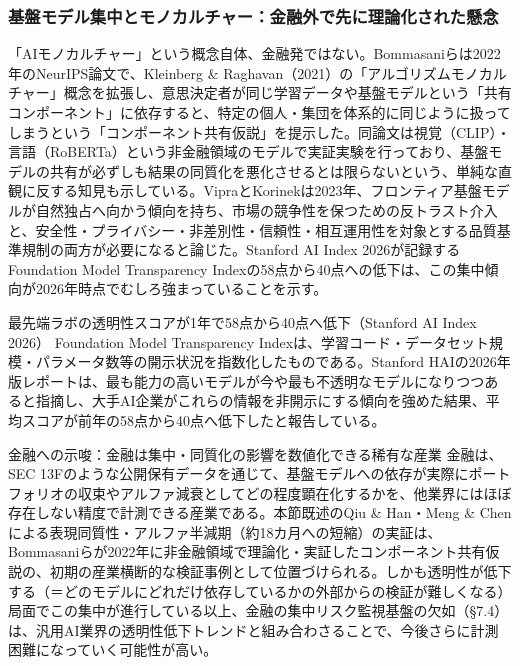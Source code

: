 \subsubsection*{基盤モデル集中とモノカルチャー：金融外で先に理論化された懸念}

「AIモノカルチャー」という概念自体、金融発ではない。Bommasaniらは2022年のNeurIPS論文で、Kleinberg \& Raghavan（2021）の「アルゴリズムモノカルチャー」概念を拡張し、意思決定者が同じ学習データや基盤モデルという「共有コンポーネント」に依存すると、特定の個人・集団を体系的に同じように扱ってしまうという「コンポーネント共有仮説」を提示した。同論文は視覚（CLIP）・言語（RoBERTa）という非金融領域のモデルで実証実験を行っており、基盤モデルの共有が必ずしも結果の同質化を悪化させるとは限らないという、単純な直観に反する知見も示している\cite{y07monoculture2022}。VipraとKorinekは2023年、フロンティア基盤モデルが自然独占へ向かう傾向を持ち、市場の競争性を保つための反トラスト介入と、安全性・プライバシー・非差別性・信頼性・相互運用性を対象とする品質基準規制の両方が必要になると論じた\cite{y07foundationconcentration2023}。Stanford AI Index 2026が記録するFoundation Model Transparency Indexの58点から40点への低下\cite{y07aiindex2026}は、この集中傾向が2026年時点でむしろ強まっていることを示す。

\begin{casestudy}{最先端ラボの透明性スコアが1年で58点から40点へ低下（Stanford AI Index 2026）}
Foundation Model Transparency Indexは、学習コード・データセット規模・パラメータ数等の開示状況を指数化したものである。Stanford HAIの2026年版レポートは、最も能力の高いモデルが今や最も不透明なモデルになりつつあると指摘し、大手AI企業がこれらの情報を非開示にする傾向を強めた結果、平均スコアが前年の58点から40点へ低下したと報告している\cite{y07aiindex2026}。
\end{casestudy}

\begin{insight}{金融への示唆：金融は集中・同質化の影響を数値化できる稀有な産業}
金融は、SEC 13Fのような公開保有データを通じて、基盤モデルへの依存が実際にポートフォリオの収束やアルファ減衰としてどの程度顕在化するかを、他業界にはほぼ存在しない精度で計測できる産業である。本節既述のQiu \& Han\cite{x07homogeneity2026}・Meng \& Chen\cite{x07alphadecay2026}による表現同質性・アルファ半減期（約18カ月への短縮）の実証は、Bommasaniらが2022年に非金融領域で理論化・実証したコンポーネント共有仮説の、初期の産業横断的な検証事例として位置づけられる。しかも透明性が低下する（＝どのモデルにどれだけ依存しているかの外部からの検証が難しくなる）局面でこの集中が進行している以上、金融の集中リスク監視基盤の欠如（\S7.4）は、汎用AI業界の透明性低下トレンドと組み合わさることで、今後さらに計測困難になっていく可能性が高い。
\end{insight}

